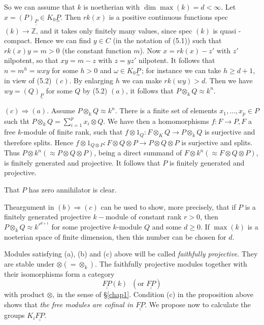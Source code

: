   So we can assume that $k$ is noetherian with $\dim \max (k)  = d <
\infty$. Let  $x = (P)_{\underline{\underline{P}}} \in K_0 \underset{=}{P}$. Then
$rk(x)$ is a positive continuous functions spec $(k) \to \mathbb{Z}$,
and it takes only finitely many values, since spec $(k)$ is quasi -
compact. Hence we can find $y \in C$ (in the notation of (5.1)) such
that $rk(x)y = m > 0$ (the constant function $m$). Now $x = rk (x) -
z'$ with $z'$ nilpotent, so that $xy = m - z$ with $z = y z' $ 
nilpotent. It follows that $n = m^h = wxy $ for some $h > 0$ and
$\omega \in K_0 \underset{=}{P}$\,; for instance we can take $h \geq d +
1$, in view of (5.2) $(c)$. By enlarging $h$ we can make $rk (wy)  >
d$. Then we have $wy = (Q)_{\underset{=}{P}}$ for some $Q$ by (5.2)
$(a)$, it follows that $P \otimes _k Q \approx k^n$.  

$(c ) \Rightarrow (a)$. Assume $P \otimes_k Q\approx k^n$. There is a
finite set of elements $x_1, \ldots, x_p \in P$ such tht $P \otimes_k
Q  = \sum\limits^p_{ i = 1}  x_i \otimes Q$. We have then a
homomorphisms $f : F \to P, F$ a free $k$-module of finite rank, such
that $f \otimes 1_Q : F \otimes _K Q \to P \otimes_k Q$ is surjective
and therefore splits. Hence $f \otimes 1_{ Q \otimes P} :F \otimes Q
\otimes P \to P \otimes Q \otimes P$ is surjective and splits. Thus $P
\otimes k^n (\approx P \otimes Q \otimes P)$, being a direct summand
of $F \otimes k^n (\approx F \otimes Q \otimes P)$, is finitely generated and
projective. It follows that $P$ is finitely generated and projective.   

That $P$ has zero annihilator is clear. 

\begin{remark*}%
The\pageoriginale argument in $(b) \Rightarrow (c)$ can be used to show, more
precisely, that if $P$ is a finitely generated projective
  $k-$module of constant rank $r > 0$, then $ P \otimes_k Q \approx
  k^{r^{ d +1}}$ for some projective $k$-module $Q$ and some $d \geq
  0$. If $\max(k) $ is a noeterian space of finite dimension, then
  this number can be chosen for $d$.  
\end{remark*} 

Modules satisfying (a), (b) and (c) above will be called
\textit{faithfully projective}. They are stable under $\otimes (= 
\otimes_k)$. The faithfully projective modules together with their
isomorphisms form a category  
$$
\underline{\underline{FP}} (k) \;\; (\text{or } \underline{\underline{FP}}) 
$$
with product $\otimes$, in the sense of \S \ref{chap1}. Condition (c) in
the proposition above shows that \textit{the free modules are cofinal
  in $\underline{\underline{FP}}$}. We propose now to calculate the groups
$K_i \underline{\underline{FP}}$.  


